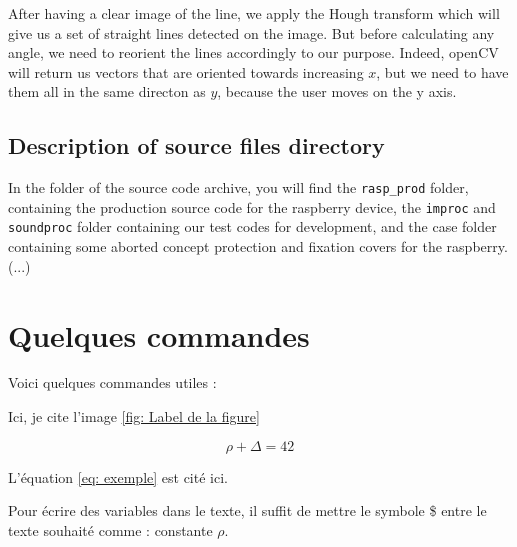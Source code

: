 \documentclass{rapport}
\begin{document}
After having a clear image of the line, we apply the Hough transform which will give us a set of straight lines detected on the image. But before calculating any angle, we need to reorient the lines accordingly to our purpose. Indeed, openCV will return us vectors that are oriented towards increasing \(x\), but we need to have them all in the same directon as \(y\), because the user moves on the y axis.


\subsection{Description of source files directory}

In the folder of the source code archive, you will find the \verb|rasp_prod| folder, containing the production source code for the raspberry device, the \verb|improc| and \verb|soundproc| folder containing our test codes for development, and the case folder containing some aborted concept protection and fixation covers for the raspberry. (...)


\section{Quelques commandes}

Voici quelques commandes utiles :


Ici, je cite l'image \ref{fig: Label de la figure}



\begin{equation} \label{eq: exemple}
\rho + \Delta = 42
\end{equation}

L'équation \ref{eq: exemple} est cité ici. 


Pour écrire des variables dans le texte, il suffit de mettre le symbole \$ entre le texte souhaité comme : constante $\rho$. 
\end{document}
